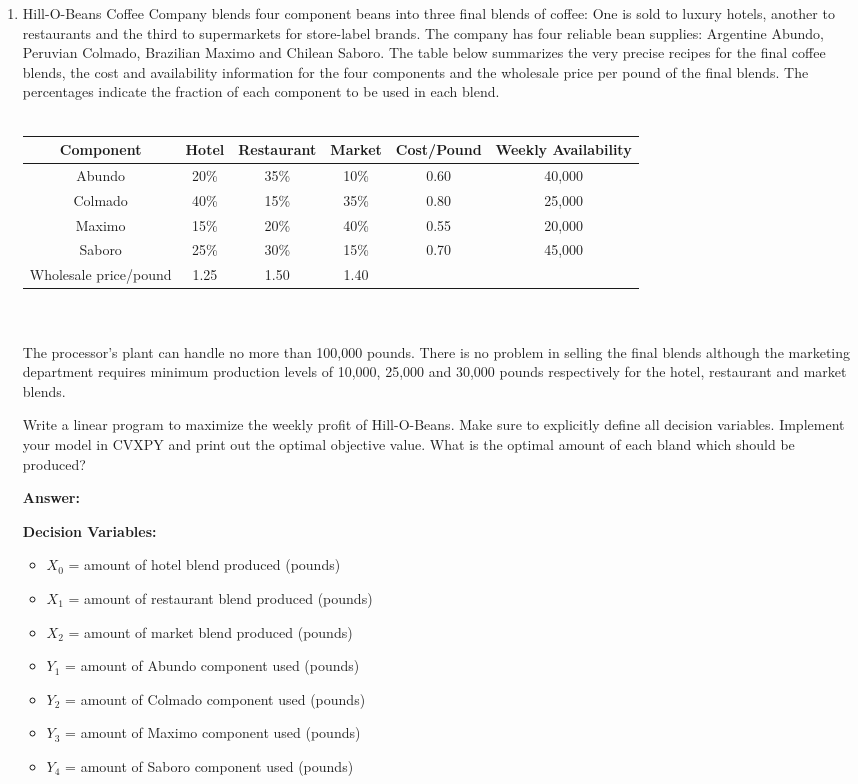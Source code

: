 \documentclass[11pt]{article}
\begin{document}
\begin{enumerate}
\item Hill-O-Beans Coffee Company blends four component beans into three final blends of coffee: One is sold to luxury hotels, another to restaurants and the third to supermarkets for store-label brands. The company has four reliable bean supplies: Argentine Abundo, Peruvian Colmado, Brazilian Maximo and Chilean Saboro. The table below summarizes the very precise recipes for the final coffee blends, the cost and availability information for the four components and the wholesale price per pound of the final blends. The percentages indicate the fraction of each component to be used in each blend.\\\\
    \begin{tabular}{|c|c|c|c|c|c|}
      \hline
      Component & Hotel & Restaurant & Market & Cost/Pound & Weekly Availability \\
      \hline
      Abundo & 20\% & 35\% & 10\% & 0.60 & 40,000 \\
      \hline
      Colmado & 40\% & 15\% & 35\% & 0.80 & 25,000 \\
      \hline
      Maximo & 15\% & 20\% & 40\% & 0.55 & 20,000 \\
      \hline
      Saboro & 25\% & 30\% & 15\% & 0.70 & 45,000 \\
      \hline
      Wholesale price/pound & 1.25 & 1.50 & 1.40 &  & \\
      \hline
    \end{tabular}\\\\
The processor's plant can handle no more than 100,000 pounds. There is no problem in selling the final blends although the marketing department requires minimum production levels of 10,000, 25,000 and 30,000 pounds respectively for the hotel, restaurant and market blends. 

Write a linear program to maximize the weekly profit of Hill-O-Beans.
 Make sure to explicitly define all decision variables. Implement your model in CVXPY and print out the optimal objective value. What is the optimal amount of each bland which should be produced?

\textbf{Answer:}

\textbf{Decision Variables:}
\begin{itemize}
\item $X_0$ = amount of hotel blend produced (pounds)
\item $X_1$ = amount of restaurant blend produced (pounds)  
\item $X_2$ = amount of market blend produced (pounds)
\item $Y_1$ = amount of Abundo component used (pounds)
\item $Y_2$ = amount of Colmado component used (pounds)
\item $Y_3$ = amount of Maximo component used (pounds)
\item $Y_4$ = amount of Saboro component used (pounds)
\end{itemize}


\end{enumerate}
\end{document}
